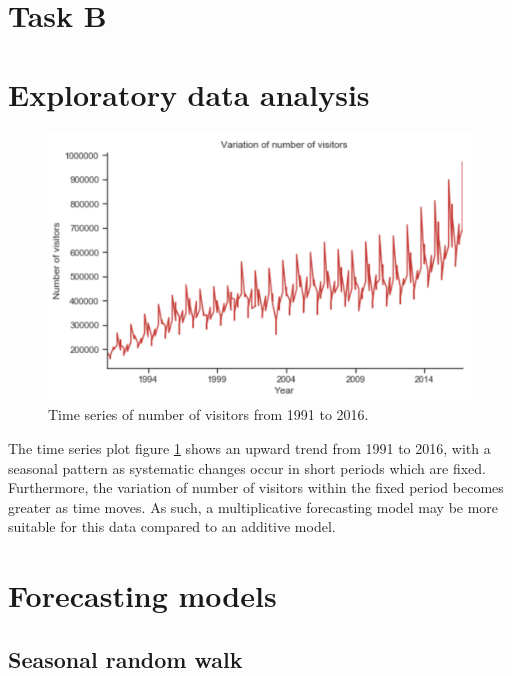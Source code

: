 \documentclass[letterpaper,12pt,twoside,]{pinp}
\begin{document}
\hypertarget{task-b}{%
\section{Task B}\label{task-b}}

\hypertarget{exploratory-data-analysis}{%
\section{Exploratory data analysis}\label{exploratory-data-analysis}}

\begin{figure}
\includegraphics[width=1\linewidth]{timeseries.png}
\centering
\caption{Time series of number of visitors from 1991 to 2016.}
\label{fig:timeseries}
\end{figure}

The time series plot figure \ref{fig:timeseries} shows an upward trend
from 1991 to 2016, with a seasonal pattern as systematic changes occur
in short periods which are fixed. Furthermore, the variation of number
of visitors within the fixed period becomes greater as time moves. As
such, a multiplicative forecasting model may be more suitable for this
data compared to an additive model.

\hypertarget{forecasting-models}{%
\section{Forecasting models}\label{forecasting-models}}

\hypertarget{seasonal-random-walk}{%
\subsection{Seasonal random walk}\label{seasonal-random-walk}}
\end{document}
